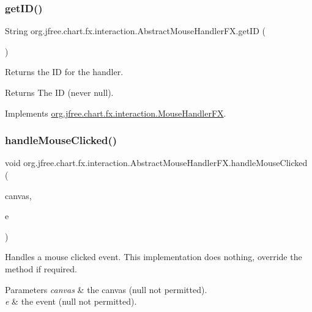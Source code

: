 \subsubsection{\texorpdfstring{get\+I\+D()}{getID()}}
{\footnotesize\ttfamily String org.\+jfree.\+chart.\+fx.\+interaction.\+Abstract\+Mouse\+Handler\+F\+X.\+get\+ID (\begin{DoxyParamCaption}{ }\end{DoxyParamCaption})}

Returns the ID for the handler.

\begin{DoxyReturn}{Returns}
The ID (never {\ttfamily null}). 
\end{DoxyReturn}


Implements \mbox{\hyperlink{interfaceorg_1_1jfree_1_1chart_1_1fx_1_1interaction_1_1_mouse_handler_f_x_a7da90cbead6cf1df2d6dacc8e729e69a}{org.\+jfree.\+chart.\+fx.\+interaction.\+Mouse\+Handler\+FX}}.

\mbox{\label{classorg_1_1jfree_1_1chart_1_1fx_1_1interaction_1_1_abstract_mouse_handler_f_x_a844c908ba8528b4f0a1afb139fd9cd36}} 
\subsubsection{\texorpdfstring{handle\+Mouse\+Clicked()}{handleMouseClicked()}}
{\footnotesize\ttfamily void org.\+jfree.\+chart.\+fx.\+interaction.\+Abstract\+Mouse\+Handler\+F\+X.\+handle\+Mouse\+Clicked (\begin{DoxyParamCaption}\item[{\mbox{\hyperlink{classorg_1_1jfree_1_1chart_1_1fx_1_1_chart_canvas}{Chart\+Canvas}}}]{canvas,  }\item[{Mouse\+Event}]{e }\end{DoxyParamCaption})}

Handles a mouse clicked event. This implementation does nothing, override the method if required.


\begin{DoxyParams}{Parameters}
{\em canvas} & the canvas ({\ttfamily null} not permitted). \\
\hline
{\em e} & the event ({\ttfamily null} not permitted). \\
\hline
\end{DoxyParams}


